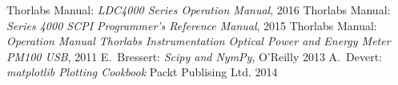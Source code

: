 \begin{thebibliography}{99}
 Thorlabs Manual:
\emph{LDC4000 Series Operation Manual},
2016
 Thorlabs Manual:
\emph{Series 4000 SCPI Programmer's Reference Manual},
2015
 Thorlabs Manual:
\emph{Operation Manual
Thorlabs Instrumentation Optical Power and Energy Meter PM100 USB},
2011
 E.~Bressert:
\emph{Scipy and NymPy},
O'Reilly 2013
  A.~Devert:
\emph{matplotlib Plotting Cookbook}
Packt Publising Ltd. 2014
\end{thebibliography}